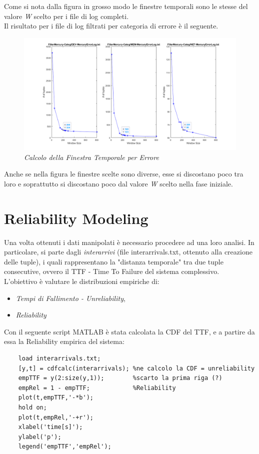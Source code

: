 Come si nota dalla figura in grosso modo le finestre temporali sono le stesse del valore \textit{W} scelto per i file di log completi.
\\Il risultato per i file di log filtrati per categoria di errore è il seguente.
\begin{figure}[H]
	\centering
	\includegraphics[width=\textwidth]{img/hw6/cwin_mercury.png}
	\caption{\textit{Calcolo della Finestra Temporale per Errore}}
\end{figure}
Anche se nella figura le finestre scelte sono diverse, esse si discostano poco tra loro e soprattutto si discostano poco dal valore \textit{W} scelto nella fase iniziale.


\section{Reliability Modeling}
Una volta ottenuti i dati manipolati è necessario procedere ad una loro analisi. In particolare, si parte dagli \textit{interarrivi} (file interarrivals.txt, ottenuto alla creazione delle tuple), i quali rappresentano la "distanza temporale" tra due tuple consecutive, ovvero il TTF - Time To Failure del sistema complessivo. 
\\L'obiettivo è valutare le distribuzioni empiriche di:
\begin{itemize}
	\item \textit{Tempi di Fallimento - Unreliability},
	\item \textit{Reliability}
\end{itemize}
Con il seguente script MATLAB è stata calcolata la CDF del TTF, e a partire da essa la Reliability empirica del sistema:
\begin{verbatim}
	load interarrivals.txt;         
	[y,t] = cdfcalc(interarrivals); %ne calcolo la CDF = unreliability
	empTTF = y(2:size(y,1));        %scarto la prima riga (?)
	empRel = 1 - empTTF;            %Reliability
	plot(t,empTTF,'-*b');
	hold on;
	plot(t,empRel,'-+r');
	xlabel('time[s]');
	ylabel('p');
	legend('empTTF','empRel');
\end{verbatim}
